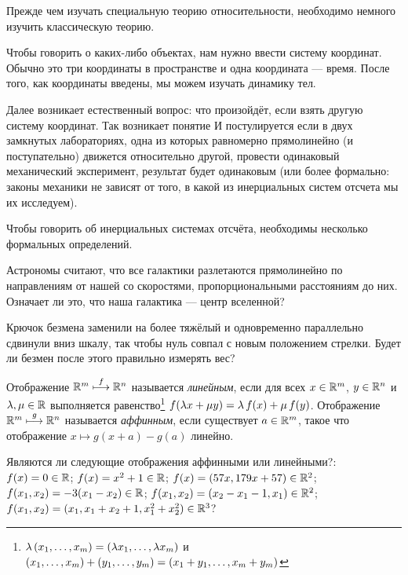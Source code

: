 \documentclass[a4paper,12pt]{scrartcl}
\begin{document}

{\footnotesize
Прежде чем изучать специальную теорию относительности, необходимо немного изучить классическую теорию.

Чтобы говорить о каких-либо объектах, нам нужно ввести систему координат.
Обычно это три координаты в пространстве и одна координата --- время. После того, как координаты введены, мы можем изучать динамику тел.

Далее возникает естественный вопрос: что произойдёт, если взять другую систему координат. Так возникает понятие   И постулируется  если в двух замкнутых лабораториях, одна из которых равномерно прямолинейно (и поступательно) движется относительно другой, провести одинаковый механический эксперимент, результат будет одинаковым (или более формально: законы механики не зависят от того, в какой из инерциальных систем отсчета мы их исследуем).

Чтобы говорить об инерциальных системах отсчёта, необходимы несколько формальных определений.
}


  Астрономы считают, что все галактики разлетаются
  прямолинейно по направлениям от нашей со скоростями,
  пропорциональными расстояниям до них. Означает ли это, что наша
  галактика --- центр вселенной?

  Крючок безмена заменили на более тяжёлый и одновременно параллельно
  сдвинули вниз шкалу, так чтобы нуль совпал с новым положением
  стрелки. Будет ли безмен после этого правильно измерять вес?


  Отображение $\mathbb{R}^m\stackrel{f}{\longmapsto}\mathbb{R}^n$ называется {\it линейным\/}, если для всех
  $x\in\mathbb{R}^m$, $y\in\mathbb{R}^n$ и $\lambda,\mu\in\mathbb{R}$ выполняется
  равенство\footnote
{$\lambda\,(x_1,\ldots, x_m) = (\lambda x_1,\ldots, \lambda x_m)$ и $(x_1,\ldots, x_m)+(y_1,\ldots, y_m) = (x_1+y_1,\ldots, x_m + y_m)$}
  $f(\lambda x+\mu y)=\lambda\,f(x)+\mu\,f(y)$. Отображение $\mathbb{R}^m\stackrel{g}{\longmapsto}\mathbb{R}^n$
  называется {\it аффинным\/}, если существует $a\in\mathbb{R}^m$, такое что
  отображение $x\longmapsto g(x+a)-g(a)$ линейно.

 Являются ли следующие отображения аффинными или линейными?:\\
 $f(x)=0 \in \mathbb{R}$;
 $f(x)= x^2+1 \in \mathbb{R}$;
 $f(x)= (57x,179x+57)\in\mathbb{R}^2$;\\
 $f(x_1,x_2)=-3(x_1 - x_2)\in\mathbb{R}$;
 $f(x_1,x_2)=(x_2 - x_1 - 1, x_1)\in\mathbb{R}^2$;\\
 $f(x_1,x_2)=(x_1, x_1+x_2+1, x_1^2+x_2^2)\in\mathbb{R}^3$?
\end{document}
